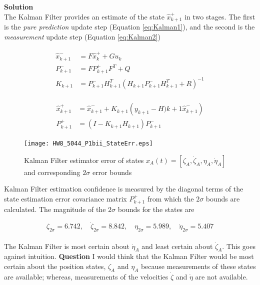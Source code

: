 \documentclass[]{article}
\begin{document}
\noindent\textbf{Solution}\\
\noindent The Kalman Filter provides an estimate of the state $\hat{x}_{k+1}^+$ in two stages. The first is the \textit{pure prediction} update step (Equation \ref{eq:Kalman1}), and the second is the \textit{measurement} update step (Equation \ref{eq:Kalman2})

\begin{eqnarray}
	\begin{aligned}
		\hat{x}_{k+1}^- &= F\hat{x}_k^+ + Gu_k\\
		P_{k+1}^- &= FP_{k+1}^+F^T + Q\\
		K_{k+1} &= P_{k+1}^-H_{k+1}^T\left(H_{k+1}P_{k+1}^-H_{k+1}^T + R\right)^{-1}
	\end{aligned}
	\label{eq:Kalman1}
\end{eqnarray}

\begin{eqnarray}
	\begin{aligned}
		\hat{x}_{k+1}^+ &= \hat{x}_{k+1}^- + K_{k+1}\left(y_{k+1}-H){k+1}\hat{x}_{k+1}^-\right)\\
		P_{k+1}^+ &= \left(I-K_{k+1}H_{k+1}\right)P_{k+1}^-
	\end{aligned}
	\label{eq:Kalman2}
\end{eqnarray}

\begin{figure}[H]
	\begin{center}  
		\texttt{[image: HW8\_5044\_P1bii\_StateErr.eps]}  
		\caption{Kalman Filter estimator error of states $x_A(t) = \left[\zeta_A, \dot{\zeta}_A, \eta_A, \dot{\eta}_A\right]$ and corresponding $2\sigma$ error bounds}
		\label{fig:HW8_5044_P1bii_StateErr}
	\end{center}  
\end{figure}

\noindent Kalman Filter estimation confidence is measured by the diagonal terms of the state estimation error covariance matrix $P_{k+1}^+$ from which the $2\sigma$ bounds are calculated. The magnitude of the $2\sigma$ bounds for the states are

$$
\zeta_{2\sigma} = 6.742,\quad \dot{\zeta}_{2\sigma} = 8.842,\quad \eta_{2\sigma} = 5.989,\quad \dot{\eta}_{2\sigma} = 5.407
$$\\

\noindent The Kalman Filter is most certain about $\dot{\eta}_A$ and least certain about $\dot{\zeta}_A$. This goes against intuition. \textbf{Question} I would think that the Kalman Filter would be most certain about the position states, $\zeta_A$ and $\eta_A$ because measurements of these states are  available; whereas, measurements of the velocities $\dot{\zeta}$ and $\dot{\eta}$ are not available.\\
\end{document}
